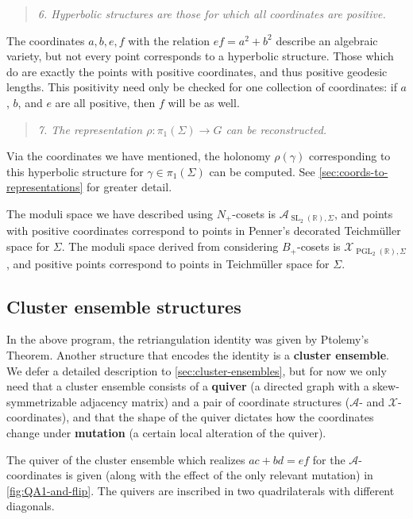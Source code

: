 \documentclass{amsart}
\theoremstyle{plain}
\theoremstyle{definition}
\theoremstyle{remark}
\newcommand{\defined}[1]{\textbf{#1}}
\DeclareMathOperator{\PGL}{PGL}
\DeclareMathOperator{\SL}{SL}
\begin{document}
  \begin{quote}
    \emph{6. Hyperbolic structures are those for which all coordinates
      are positive.}
  \end{quote}

  The coordinates $a, b, e, f$ with the relation $ef = a^2 + b^2$
  describe an algebraic variety, but not every point corresponds to a
  hyperbolic structure. Those which do are exactly the points with
  positive coordinates, and thus positive geodesic lengths. This
  positivity need only be checked for one collection of coordinates: if
  $a$, $b$, and $e$ are all positive, then $f$ will be as well.

  \begin{quote}
    \emph{7. The representation $\rho : \pi_1(\Sigma) \to G$ can be
      reconstructed.}
  \end{quote}

  Via the coordinates we have mentioned, the holonomy $\rho(\gamma)$
  corresponding to this hyperbolic structure for $\gamma \in
  \pi_1(\Sigma)$ can be computed. See
  \cref{sec:coords-to-representations} for greater detail.

  The moduli space we have described using $N_{+}$-cosets is
  $\mathcal{A}_{\SL_2(\mathbb{R}),\Sigma}$, and points with positive
  coordinates correspond to points in Penner's decorated Teichmüller
  space for $\Sigma$. The moduli space derived from considering
  $B_{+}$-cosets is $\mathcal{X}_{\PGL_2(\mathbb{R}),\Sigma}$, and
  positive points correspond to points in Teichmüller space for
  $\Sigma$.

  \subsection{Cluster ensemble structures}

  In the above program, the retriangulation identity was given by
  Ptolemy's Theorem. Another structure that encodes the identity is a
  \defined{cluster ensemble}. We defer a detailed description to
  \cref{sec:cluster-ensembles}, but for now we only need that a cluster
  ensemble consists of a \defined{quiver} (a directed graph with a
  skew-symmetrizable adjacency matrix) and a pair of coordinate
  structures ($\mathcal{A}$- and $\mathcal{X}$-coordinates), and that
  the shape of the quiver dictates how the coordinates change under
  \defined{mutation} (a certain local alteration of the quiver).

  The quiver of the cluster ensemble which realizes $ac + bd = ef$ for
  the $\mathcal{A}$-coordinates is given (along with the effect of the
  only relevant mutation) in \cref{fig:QA1-and-flip}. The quivers are
  inscribed in two quadrilaterals with different diagonals.
\end{document}
